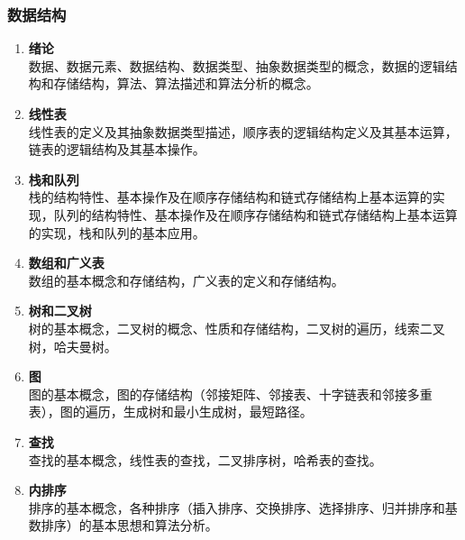 \documentclass{../note}
\begin{document}
\subsubsection{数据结构}
\begin{enumerate}
  \item \textbf{绪论}\\
    数据、数据元素、数据结构、数据类型、抽象数据类型的概念，数据的逻辑结构和存储结构，算法、算法描述和算法分析的概念。

  \item \textbf{线性表}\\
    线性表的定义及其抽象数据类型描述，顺序表的逻辑结构定义及其基本运算，链表的逻辑结构及其基本操作。

  \item \textbf{栈和队列}\\
    栈的结构特性、基本操作及在顺序存储结构和链式存储结构上基本运算的实现，队列的结构特性、基本操作及在顺序存储结构和链式存储结构上基本运算的实现，栈和队列的基本应用。

  \item \textbf{数组和广义表}\\
    数组的基本概念和存储结构，广义表的定义和存储结构。

  \item \textbf{树和二叉树}\\
    树的基本概念，二叉树的概念、性质和存储结构，二叉树的遍历，线索二叉树，哈夫曼树。

  \item \textbf{图}\\
    图的基本概念，图的存储结构（邻接矩阵、邻接表、十字链表和邻接多重表），图的遍历，生成树和最小生成树，最短路径。

  \item \textbf{查找}\\
    查找的基本概念，线性表的查找，二叉排序树，哈希表的查找。

  \item \textbf{内排序}\\
    排序的基本概念，各种排序（插入排序、交换排序、选择排序、归并排序和基数排序）的基本思想和算法分析。
\end{enumerate}
\end{document}
